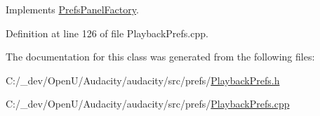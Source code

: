 Implements \hyperlink{class_prefs_panel_factory_a4814184d6050665a43f4929caa73aa0c}{Prefs\+Panel\+Factory}.



Definition at line 126 of file Playback\+Prefs.\+cpp.



The documentation for this class was generated from the following files\+:\begin{DoxyCompactItemize}
\item 
C\+:/\+\_\+dev/\+Open\+U/\+Audacity/audacity/src/prefs/\hyperlink{_playback_prefs_8h}{Playback\+Prefs.\+h}\item 
C\+:/\+\_\+dev/\+Open\+U/\+Audacity/audacity/src/prefs/\hyperlink{_playback_prefs_8cpp}{Playback\+Prefs.\+cpp}\end{DoxyCompactItemize}
